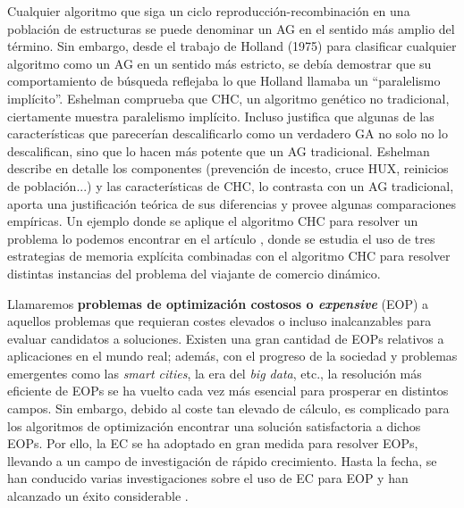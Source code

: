 
Cualquier algoritmo que siga un ciclo reproducción-recombinación en una población de estructuras se puede denominar un AG en el sentido más amplio del término. 
Sin embargo, desde el trabajo de Holland (1975) 
para clasificar cualquier algoritmo como un AG en un sentido más estricto, se debía demostrar que su comportamiento de búsqueda reflejaba lo que Holland llamaba un ``paralelismo implícito''. 
Eshelman \parencite{eshelmanCHCAdaptiveSearch1991a} comprueba que CHC, un algoritmo genético no tradicional, ciertamente muestra paralelismo implícito. 
Incluso justifica que algunas de las características que parecerían descalificarlo como un verdadero GA no solo no lo descalifican, sino que lo hacen más potente que un AG tradicional.  \parencite{eshelmanCHCAdaptiveSearch1991a} Eshelman describe en detalle los componentes (prevención de incesto, cruce HUX, reinicios de población...) y las características de CHC, lo contrasta con un AG tradicional, aporta una justificación teórica de sus diferencias y provee algunas comparaciones empíricas. 
Un ejemplo donde se aplique el algoritmo CHC para resolver un problema lo podemos encontrar en el artículo \parencite{simoesCHCBasedAlgorithmsDynamic2011}, donde se estudia el uso de tres estrategias de memoria explícita combinadas con el algoritmo CHC para resolver distintas instancias del problema del viajante de comercio dinámico. 


Llamaremos \textbf{problemas de optimización costosos o \textit{expensive}} (EOP) a aquellos problemas que requieran costes elevados o incluso inalcanzables para evaluar candidatos a soluciones. 
Existen una gran cantidad de EOPs relativos a aplicaciones en el mundo real; además, con el progreso de la sociedad y problemas emergentes como las \textit{smart cities}, la era del \textit{big data}, etc., la resolución más eficiente de EOPs se ha vuelto cada vez más esencial para prosperar en distintos campos. 
Sin embargo, debido al coste tan elevado de cálculo, es complicado para los algoritmos de optimización encontrar una solución satisfactoria a dichos EOPs. 
Por ello, la EC se ha adoptado en gran medida para resolver EOPs, llevando a un campo de investigación de rápido crecimiento. 
Hasta la fecha, se han conducido varias investigaciones sobre el uso de EC para EOP y han alcanzado un éxito considerable \parencite{liEvolutionaryComputationExpensive2022} \parencite{jinComprehensiveSurveyFitness2005} \parencite{shanSurveyModelingOptimization2010} \parencite{tenneComputationalIntelligenceExpensive2010}.

